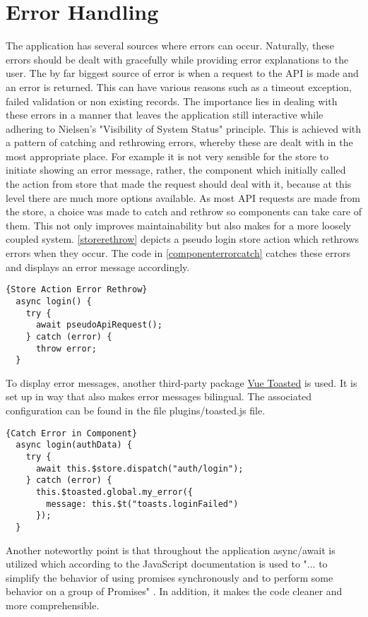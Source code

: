 \section{Error Handling}
The application has several sources where errors can occur. Naturally, these errors should be dealt with gracefully while providing error explanations to the user. The by far biggest source of error is when a request to the API is made and an error is returned. This can have various reasons such as a timeout exception, failed validation or non existing records. The importance lies in dealing with these errors in a manner that leaves the application still interactive while adhering to Nielsen's "Visibility of System Status" principle. This is achieved with a pattern of catching and rethrowing errors, whereby these are dealt with in the most appropriate place. For example it is not very sensible for the store to initiate showing an error message, rather, the component which initially called the action from store that made the request should deal with it, because at this level there are much more options available. As most API requests are made from the store, a choice was made to catch and rethrow so components can take care of them. This not only improves maintainability but also makes for a more loosely coupled system. \autoref{storerethrow} depicts a pseudo login store action which rethrows errors when they occur. The code in \autoref{componenterrorcatch} catches these errors and displays an error message accordingly. \newline

\begin{lstlisting}[caption=Store Action Error Rethrow, captionpos=b, style=htmlcssjs, label=storerethrow]{Store Action Error Rethrow}
  async login() {
    try {
      await pseudoApiRequest();
    } catch (error) {
      throw error;
  }
\end{lstlisting}

To display error messages, another third-party package \href{https://github.com/shakee93/vue-toasted}{Vue Toasted} is used. It is set up in way that also makes error messages bilingual. The associated configuration can be found in the file plugins/toasted.js file. \newline

\begin{lstlisting}[caption=Catch Error in Component, captionpos=b, style=htmlcssjs, label=componenterrorcatch]{Catch Error in Component}
  async login(authData) {
    try {
      await this.$store.dispatch("auth/login");
    } catch (error) {
      this.$toasted.global.my_error({
        message: this.$t("toasts.loginFailed")
      });
  }
\end{lstlisting}

Another noteworthy point is that throughout the application async/await is utilized which according to the JavaScript documentation is used to "... to simplify the behavior of using promises synchronously and to perform some behavior on a group of Promises" \cite{JavaCriptDoc:online}. In addition, it makes the code cleaner and more comprehensible.
